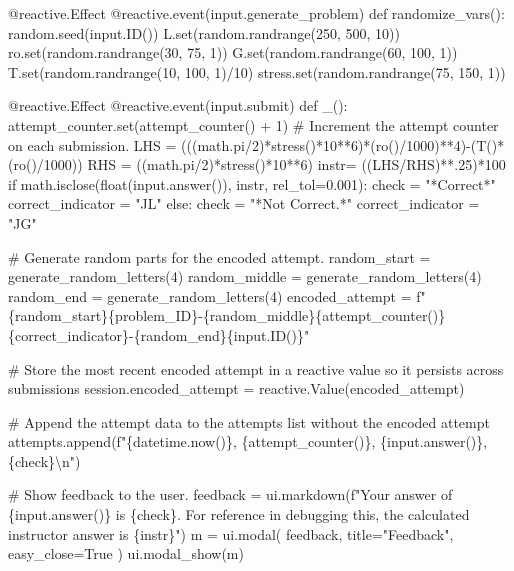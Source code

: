 \documentclass[
  letterpaper,
  DIV=11,
  numbers=noendperiod]{scrreprt}
\newenvironment{Shaded}{\begin{snugshade}}{\end{snugshade}}
\newcommand{\NormalTok}[1]{\textcolor[rgb]{0.00,0.23,0.31}{#1}}
\begin{document}
\begin{Shaded}
\begin{Highlighting}[]
\NormalTok{    @reactive.Effect}
\NormalTok{    @reactive.event(input.generate\_problem)}
\NormalTok{    def randomize\_vars():}
\NormalTok{        random.seed(input.ID())}
\NormalTok{        L.set(random.randrange(250, 500, 10))}
\NormalTok{        ro.set(random.randrange(30, 75, 1))}
\NormalTok{        G.set(random.randrange(60, 100, 1))}
\NormalTok{        T.set(random.randrange(10, 100, 1)/10)}
\NormalTok{        stress.set(random.randrange(75, 150, 1))}
        
        
\NormalTok{    @reactive.Effect}
\NormalTok{    @reactive.event(input.submit)}
\NormalTok{    def \_():}
\NormalTok{        attempt\_counter.set(attempt\_counter() + 1)  \# Increment the attempt counter on each submission.}
\NormalTok{        LHS = (((math.pi/2)*stress()*10**6)*(ro()/1000)**4){-}(T()*(ro()/1000))}
\NormalTok{        RHS = ((math.pi/2)*stress()*10**6)}
\NormalTok{        instr= ((LHS/RHS)**.25)*100}
\NormalTok{        if math.isclose(float(input.answer()), instr, rel\_tol=0.001):}
\NormalTok{            check = "*Correct*"}
\NormalTok{            correct\_indicator = "JL"}
\NormalTok{        else:}
\NormalTok{            check = "*Not Correct.*"}
\NormalTok{            correct\_indicator = "JG"}

\NormalTok{        \# Generate random parts for the encoded attempt.}
\NormalTok{        random\_start = generate\_random\_letters(4)}
\NormalTok{        random\_middle = generate\_random\_letters(4)}
\NormalTok{        random\_end = generate\_random\_letters(4)}
\NormalTok{        encoded\_attempt = f"\{random\_start\}\{problem\_ID\}{-}\{random\_middle\}\{attempt\_counter()\}\{correct\_indicator\}{-}\{random\_end\}\{input.ID()\}"}

\NormalTok{        \# Store the most recent encoded attempt in a reactive value so it persists across submissions}
\NormalTok{        session.encoded\_attempt = reactive.Value(encoded\_attempt)}

\NormalTok{        \# Append the attempt data to the attempts list without the encoded attempt}
\NormalTok{        attempts.append(f"\{datetime.now()\}, \{attempt\_counter()\}, \{input.answer()\}, \{check\}\textbackslash{}n")}

\NormalTok{        \# Show feedback to the user.}
\NormalTok{        feedback = ui.markdown(f"Your answer of \{input.answer()\} is \{check\}. For reference in debugging this, the calculated instructor answer is \{instr\}")}
\NormalTok{        m = ui.modal(}
\NormalTok{            feedback,}
\NormalTok{            title="Feedback",}
\NormalTok{            easy\_close=True}
\NormalTok{        )}
\NormalTok{        ui.modal\_show(m)}


\end{Highlighting}
\end{Shaded}
\end{document}
